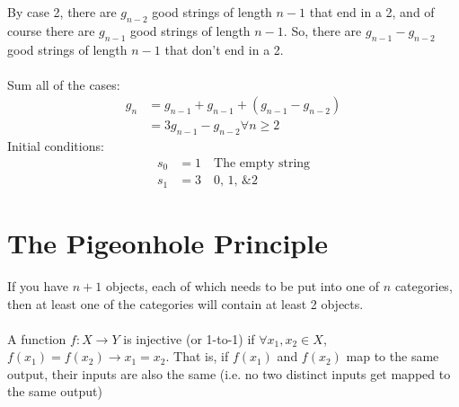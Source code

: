 \documentclass[12pt]{article}
\begin{document}
	By case 2, there are $g_{n-2}$ good strings of length $n-1$ that end in a 2, and of course there are $g_{n - 1}$ good strings of length $n - 1$. So, there are $g_{n-1} - g_{n-2}$ good strings of length $n-1$ that don't end in a 2.\\\\
	Sum all of the cases:
	\begin{align*}
		g_n &= g_{n - 1} + g_{n - 1} + (g_{n - 1} - g_{n - 2}) \\
			&= 3g_{n - 1} - g_{n - 2} \forall n \geq 2
	\end{align*}
	Initial conditions:
	\begin{align*}
		s_0 &= 1 \quad \text{The empty string} \\
		s_1 &= 3 \quad \text{0, 1, \& 2}
	\end{align*}
	\section{The Pigeonhole Principle}
	If you have $n + 1$ objects, each of which needs to be put into one of $n$ categories, then at least one of the categories will contain at least 2 objects. \\\\
	A function $f: X \rightarrow Y$ is injective (or 1-to-1) if $\forall x_1, x_2 \in X$, $f(x_1) = f(x_2) \rightarrow x_1 = x_2$. That is, if $f(x_1)$ and $f(x_2)$ map to the same output, their inputs are also the same (i.e. no two distinct inputs get mapped to the same output)
\end{document}
